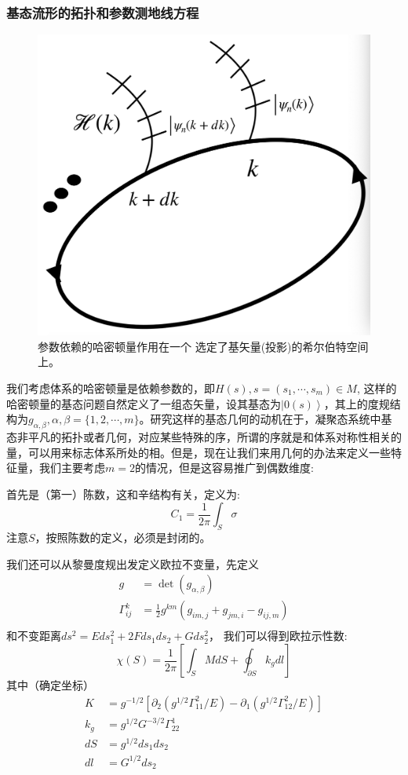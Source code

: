 \documentclass[supercite]{HustGraduPaper}
\newcommand{\ket}[1]{\left| #1 \right\rangle}
\begin{document}
\subsubsection{基态流形的拓扑和参数测地线方程\label{subsub2}}
\begin{figure}
	\centering
	\includegraphics[width=0.7\linewidth]{Figures/screenshot004}
	\caption{参数依赖的哈密顿量作用在一个 选定了基矢量(投影)的希尔伯特空间上。}
	\label{fig:screenshot004}
\end{figure}


我们考虑体系的哈密顿量是依赖参数的，即$H(s), s = (s_1,\cdots,s_m) \in M$, 这样的哈密顿量的基态问题自然定义了一组态矢量，设其基态为$\ket{0(s)}$，其上的度规结构为$g_{\alpha,\beta}, \alpha,\beta = \{1,2,\cdots,m\}$。研究这样的基态几何的动机在于，凝聚态系统中基态非平凡的拓扑或者几何，对应某些特殊的序，所谓的序就是和体系对称性相关的量，可以用来标志体系所处的相。但是，现在让我们来用几何的办法来定义一些特征量，我们主要考虑$m=2$的情况，但是这容易推广到偶数维度:

首先是（第一）陈数，这和辛结构有关，定义为:
\begin{equation}
C_1 =\frac{1}{2\pi} \int_S \sigma
\end{equation}
注意$S$，按照陈数的定义，必须是封闭的。

我们还可以从黎曼度规出发定义欧拉不变量，先定义
\begin{equation}
\begin{aligned}
g &= \det(g_{\alpha,\beta})\\
\Gamma_{ij}^k &= \frac{1}{2}g^{km}(g_{im,j}+g_{jm,i} - g_{ij,m})\\
\end{aligned}
\end{equation}
和不变距离$ds^2 = Eds_1^2 + 2Fds_1ds_2 + Gds_2^2$，
我们可以得到欧拉示性数:
\begin{equation}
\chi(S) = \frac{1}{2\pi}[\int_S MdS + \oint_{\partial S}k_gdl]
\end{equation}
其中（确定坐标）
\begin{equation}
\begin{aligned}
K& = g^{-1/2}[\partial_2 (g^{1/2} \Gamma_{11}^2/E) - \partial_1(g^{1/2}\Gamma_{12}^2 /E)]\\
k_g &= g^{1/2}G^{-3/2}\Gamma_{22}^1\\
dS &= g^{1/2} ds_1ds_2\\
dl &= G^{1/2}ds_2
\end{aligned}
\end{equation}
\end{document}

